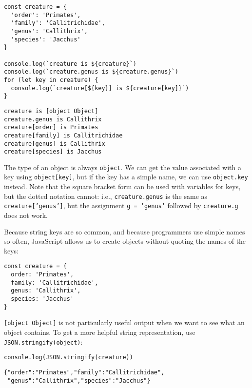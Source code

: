 \begin{verbatim}
const creature = {
  'order': 'Primates',
  'family': 'Callitrichidae',
  'genus': 'Callithrix',
  'species': 'Jacchus'
}

console.log(`creature is ${creature}`)
console.log(`creature.genus is ${creature.genus}`)
for (let key in creature) {
  console.log(`creature[${key}] is ${creature[key]}`)
}
\end{verbatim}

\begin{verbatim}
creature is [object Object]
creature.genus is Callithrix
creature[order] is Primates
creature[family] is Callitrichidae
creature[genus] is Callithrix
creature[species] is Jacchus
\end{verbatim}


The type of an object is always \texttt{object}.
We can get the value associated with a key using \texttt{object[key]},
but if the key has a simple name,
we can use \texttt{object.key} instead.
Note that the square bracket form can be used with variables for keys,
but the dotted notation cannot:
i.e.,
\texttt{creature.genus} is the same as \texttt{creature['genus']},
but the assignment \texttt{g\ =\ 'genus'} followed by \texttt{creature.g} does not work.

Because string keys are so common,
and because programmers use simple names so often,
JavaScript allows us to create objects without quoting the names of the keys:

\begin{verbatim}
const creature = {
  order: 'Primates',
  family: 'Callitrichidae',
  genus: 'Callithrix',
  species: 'Jacchus'
}
\end{verbatim}

\texttt{[object\ Object]} is not particularly useful output when we want to see what an object contains.
To get a more helpful string representation,
use \texttt{JSON.stringify(object)}:

\begin{verbatim}
console.log(JSON.stringify(creature))
\end{verbatim}

\begin{verbatim}
{"order":"Primates","family":"Callitrichidae",
 "genus":"Callithrix","species":"Jacchus"}
\end{verbatim}

